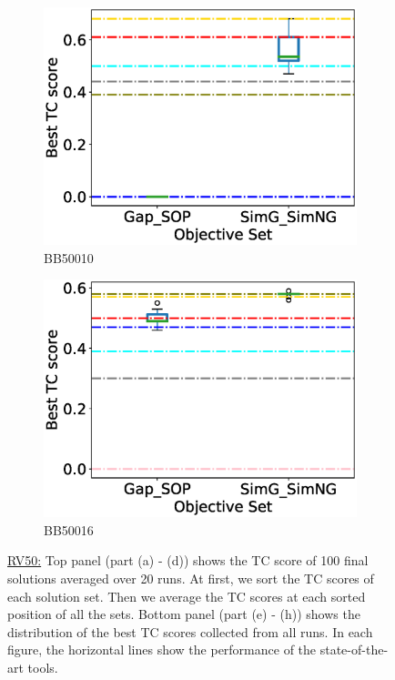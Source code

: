 \begin{figure}[!htbp]
\begin{adjustwidth}{-1cm}{-1cm}
\begin{subfigure}{0.22\textwidth}
			\includegraphics[width=\columnwidth]{Figure/summary/precomputedInit/Balibase/BB50010_objset_tc_rank_2}
			\caption{BB50010}
		\end{subfigure}
		\begin{subfigure}{0.22\textwidth}
			\includegraphics[width=\columnwidth]{Figure/summary/precomputedInit/Balibase/BB50016_objset_tc_rank_2}
			\caption{BB50016}
		\end{subfigure}
		\caption{\underline{RV50:} Top panel (part (a) - (d)) shows the TC score of 100 final solutions averaged over 20 runs. At first, we sort the TC scores of each solution set. Then we average the TC scores at each sorted position of all the sets. Bottom panel (part (e) - (h)) shows the distribution of the best TC scores collected from all runs. In each figure, the horizontal lines show the performance of the state-of-the-art tools.}
		\label{fig:rv50_tc}
	\end{adjustwidth}
\end{figure}


